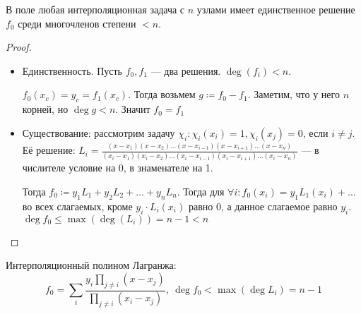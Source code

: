 \begin{theorem}
    В поле любая интерполяционная задача с $n$ узлами имеет единственное решение  $f_0$ среди многочленов степени $<n$.
\end{theorem}
\begin{proof}
    \slashn
    \begin{itemize}
    \item Единственность. Пусть $f_0, f_1$ --- два решения.  $\deg(f_i) < n$.  

        $f_0(x_c) = y_c = f_1(x_c)$. Тогда возьмем $g \coloneqq f_0 - f_1$. Заметим, что у него  $n$ корней, но  $\deg g< n$. Значит  $f_0=f_1$
\item Существование: рассмотрим задачу $\chi_i\!: \chi_i(x_i) = 1, \chi_i(x_j) = 0$, если  $i \neq j$. Её решение:  $L_i = \frac{(x-x_1)(x-x_2)\ldots(x - x_{i-1})(x - x_{i+1})\ldots(x - x_n)}{(x_i - x_1)(x_i - x_2)\ldots(x_i - x_{i - 1}) (x_i - x_{i+1}) \ldots (x_i - x_n)}$ --- в числителе условие на 0, в знаменателе на 1.

	Тогда $f_0 \coloneqq y_1 L_1 + y_2 L_2 + \ldots +y_nL_n$. Тогда для $\forall i\!: f_0(x_i) = y_1L_1(x_i) + \ldots$ во всех слагаемых, кроме $y_i \cdot L_i(x_i)$ равно 0, а данное слагаемое равно  $y_i$. $\deg f_0 \le \max(\deg(L_i)) = n - 1 < n$
    \end{itemize}
\end{proof}
\begin{definition}
Интерполяционный полином Лагранжа: \[f_0 = \sum_i \frac{y_i \prod_{j \neq i}(x - x_j)}{\prod_{j \neq i}(x_i - x_j)},\ \deg f_0 < \max(\deg L_i) = n-1\]
\end{definition}


